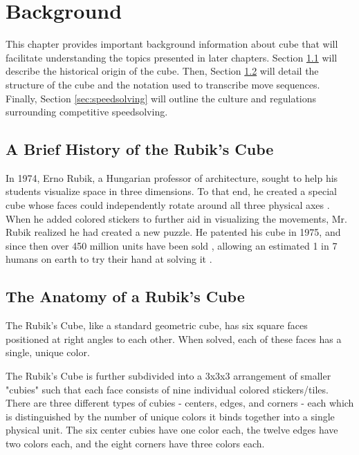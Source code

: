 \chapter{Background}
\label{Chapter2}

This chapter provides important background information about cube that
will facilitate understanding the topics presented in later chapters.
Section \ref{sec:rubiks-history} will describe the historical origin of
the cube. Then, Section \ref{sec:rubiks-anatomy} will detail the
structure of the cube and the notation used to transcribe move
sequences. Finally, Section \ref{sec:speedsolving} will outline the
culture and regulations surrounding competitive speedsolving.


\section{A Brief History of the Rubik's Cube}
\label{sec:rubiks-history}

In 1974, Erno Rubik, a Hungarian professor of architecture, sought to
help his students visualize space in three dimensions. To that end, he
created a special cube whose faces could independently rotate around
all three physical axes \cite{rubik-motivation}. When he added colored
stickers to further aid in visualizing the movements, Mr. Rubik
realized he had created a new puzzle. He patented his cube in 1975,
\cite{rubik-patent} and since then over 450 million units have been
sold \cite{forbes-rubik-merger}, allowing an estimated 1 in 7 humans on
earth to try their hand at solving it \cite{rubik-population-reached}.


\section{The Anatomy of a Rubik's Cube}
\label{sec:rubiks-anatomy}

The Rubik's Cube, like a standard geometric cube, has six square faces
positioned at right angles to each other. When solved, each of these
faces has a single, unique color.

The Rubik's Cube is further subdivided into a 3x3x3 arrangement of
smaller "cubies" such that each face consists of nine individual
colored stickers/tiles. There are three different types of cubies -
centers, edges, and corners - each which is distinguished by the number
of unique colors it binds together into a single physical unit. The six
center cubies have one color each, the twelve edges have two colors
each, and the eight corners have three colors each.


